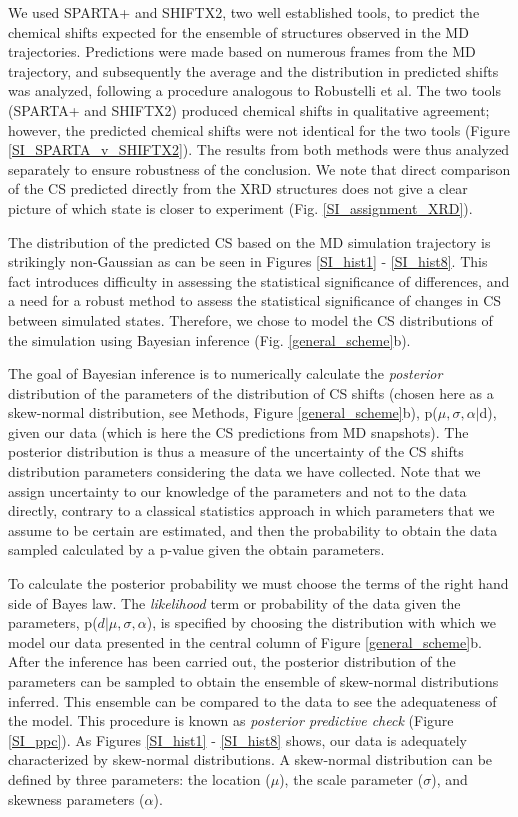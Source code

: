 \documentclass[%
 aip,
 amsmath,amssymb,
 preprint,%
]{revtex4-1}
\begin{document}
We used SPARTA+\cite{Shen2010} and SHIFTX2,\cite{Han2011} two well established tools, to predict the chemical shifts expected for the ensemble of structures observed in the MD trajectories. Predictions were made based on numerous frames from the MD trajectory, and subsequently the average and the distribution in predicted shifts was analyzed, following a procedure analogous to Robustelli et al.\cite{Robustelli2012} The two tools (SPARTA+ and SHIFTX2) produced chemical shifts in qualitative agreement; however, the predicted chemical shifts were not identical for the two tools (Figure \ref{SI_SPARTA_v_SHIFTX2}). The results from both methods were thus analyzed separately to ensure robustness of the conclusion. We note that direct comparison of the CS predicted directly from the XRD structures does not give a clear picture of which state is closer to experiment (Fig. \ref{SI_assignment_XRD}).

The distribution of the predicted CS based on the MD simulation trajectory is strikingly non-Gaussian as can be seen in Figures \ref{SI_hist1} - \ref{SI_hist8}. This fact  introduces difficulty in  assessing the statistical significance of differences, and a need for a robust method to assess the statistical significance of changes in CS between simulated states. Therefore, we chose to model the CS distributions of the simulation using Bayesian inference (Fig. \ref{general_scheme}b). 

The goal of Bayesian inference is to numerically calculate the \textit{posterior} distribution of the parameters of the distribution of CS shifts (chosen here as a skew-normal distribution, see Methods, Figure \ref{general_scheme}b), p($\mu,\sigma,\alpha \vert $d), given our data (which is here the CS predictions from MD snapshots). The posterior distribution is thus a measure of the uncertainty of the CS shifts distribution parameters considering the data we have collected. Note that we assign uncertainty to our knowledge of the parameters and not to the data directly, contrary to a classical statistics approach in which parameters that we assume to be certain are estimated, and then the probability to obtain the data sampled calculated by a p-value given the obtain parameters. 

To calculate the posterior probability we must choose the terms of the right hand side of Bayes law. The \textit{likelihood} term or probability of the data given the parameters, p($d \vert \mu,\sigma,\alpha$), is specified by choosing the distribution with which we model our data presented in the central column of Figure \ref{general_scheme}b. After the inference has been carried out, the posterior distribution of the parameters can be sampled to obtain the ensemble of skew-normal distributions inferred. This ensemble can be compared to the data to see the adequateness of the model. This procedure is known as \textit{posterior predictive check} (Figure \ref{SI_ppc}). As Figures \ref{SI_hist1} - \ref{SI_hist8} shows, our data is adequately characterized by skew-normal distributions. A skew-normal distribution can be defined by three parameters: the location ($\mu$), the scale parameter ($\sigma$), and skewness parameters ($\alpha$).
\end{document}
